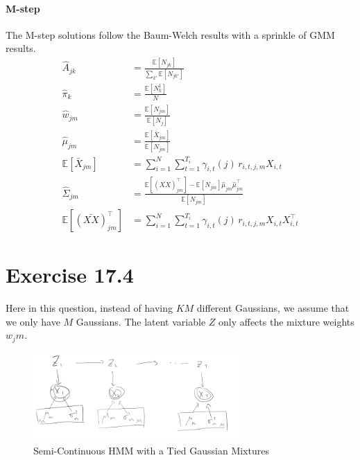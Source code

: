 \documentclass[11pt, letterpaper]{article}
\begin{document}
\paragraph{M-step}
The M-step solutions follow the Baum-Welch results with a sprinkle of GMM results.
\begin{align*}
    \hat{A}_{jk} &= \frac{\mathbb{E}[N_{jk}]}{\sum_{k'} \mathbb{E}[N_{jk'}]} \\
    \hat{\pi}_k &= \frac{\mathbb{E}[N_{k}^1]}{N} \\
    \hat{w}_{jm} &= \frac{\mathbb{E}[N_{jm}]}{\mathbb{E}[N_{j}]} \\
    \hat{\mu}_{jm} &= \frac{\mathbb{E}[\bar{X}_{jm}]}{\mathbb{E}[N_{jm}]} \\
    \mathbb{E}[\bar{X}_{jm}] &=
        \sum_{i=1}^N \sum_{t=1}^{T_i} \gamma_{i,t}(j) \, r_{i,t,j,m} X_{i,t} \\
    \hat{\Sigma}_{jm} &=
        \frac{
            \mathbb{E}[(\bar{XX})^{\intercal}_{jm}]
            - \mathbb{E}[N_{jm}] \hat{\mu}_{jm} \hat{\mu}_{jm}^{\intercal}
        } {\mathbb{E}[N_{jm}]} \\
    \mathbb{E}[(\bar{XX})^{\intercal}_{jm}] &=
        \sum_{i=1}^N \sum_{t=1}^{T_i} \gamma_{i,t}(j) \, r_{i,t,j,m} X_{i,t} X_{i,t}^{\intercal} 
\end{align*}

\newpage
\section{Exercise 17.4}
Here in this question, instead of having $KM$ different Gaussians, we assume that we only have $M$ Gaussians. The latent variable $Z$ only affects the mixture weights $w_jm$.
\begin{figure}[!h]
  \centering
  \includegraphics[width=0.7\textwidth]{17.4.png}
  \captionsetup{justification=centering}
  \caption{Semi-Continuous HMM with a Tied Gaussian Mixtures}
\end{figure}
\end{document}
